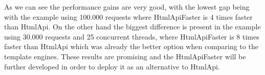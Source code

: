 As we can see the performance gains are very good, with the lowest gap being with the example using 100.000 requests where HtmlApiFaster is 4 times faster than HtmlApi. On the other hand the biggest difference is present in the example using 30.000 requests and 25 concurrent threads, where HtmlApiFaster is 8 times faster than HtmlApi which was already the better option when comparing to the template engines. These results are promising and the HtmlApiFaster will be further developed in order to deploy it as an alternative to HtmlApi.